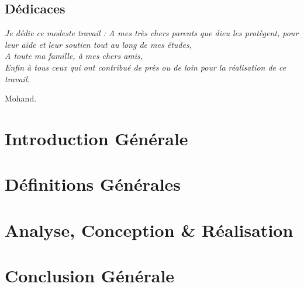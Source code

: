\documentclass[11pt,a4paper,onecolumn,openright,oneside]{report}
\begin{document}
    \chapter*{\huge Dédicaces}
	
	\begin{center}
		\it \Large
		Je dédie ce modeste travail :
		A mes très chers parents que dieu les
		protègent, pour leur aide et leur soutien tout au long
		de mes études,\\
		
		A toute ma famille, à mes chers amis,\\
		
		Enfin à tous ceux qui ont contribué de près
		ou de loin pour la réalisation de ce travail.\\
		
		\leftskip=12cm
		
		Mohand.
		
		\leftskip=0cm
		
	\end{center}
	
	\tableofcontents
	\listoffigures
	\listoftables

	

	\pagestyle{fancy}
	\fancyhead{}
	
	\renewcommand{\chaptermark}[1]{\markboth{\bsc{\chaptername~\thechapter{} :} #1}{}}
	
	\lhead[\textsl{\rightmark}]{\textsl{\leftmark}}
	
	\renewcommand{\headrulewidth}{1.2pt}
	
	\newcommand\blfootnote[1]{
		\begingroup
		\renewcommand\thefootnote{}\footnote{#1}
		\addtocounter{footnote}{-1}
		\endgroup
	}

	\part{Introduction Générale}
		
	
	\part{Définitions Générales}
		
		

	\part{Analyse, Conception \& Réalisation}
		
		

	\part{Conclusion Générale}
		

	\leftskip=0cm
	\renewcommand{\bibname}{Référence bibliographique et webographique}
	
	
	
\end{document}
